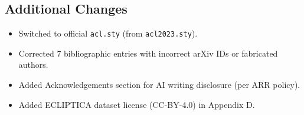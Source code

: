 \documentclass[11pt]{article}
\begin{document}
\subsection*{Additional Changes}
\begin{itemize}[leftmargin=*]
    \item Switched to official \texttt{acl.sty} (from \texttt{acl2023.sty}).
    \item Corrected 7 bibliographic entries with incorrect arXiv IDs or fabricated authors.
    \item Added Acknowledgements section for AI writing disclosure (per ARR policy).
    \item Added ECLIPTICA dataset license (CC-BY-4.0) in Appendix D.
\end{itemize}
\end{document}
